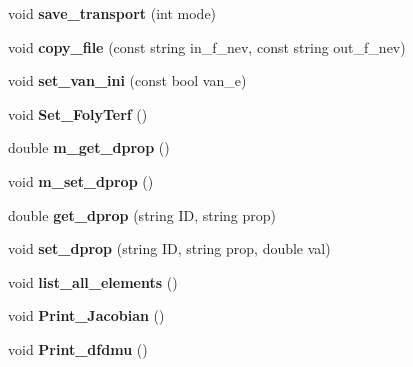 \begin{DoxyCompactItemize}
\item 
\mbox{\label{class_staci_a9c1d34d2dc05eaad3c5ba60d5ebfa5a1}} 
void {\bfseries save\+\_\+transport} (int mode)
\item 
\mbox{\label{class_staci_ac38df6cb7fb51eb595c17cd050a85073}} 
void {\bfseries copy\+\_\+file} (const string in\+\_\+f\+\_\+nev, const string out\+\_\+f\+\_\+nev)
\item 
\mbox{\label{class_staci_a0f2f821b672c0aa1a2f9a9117c2f67ef}} 
void {\bfseries set\+\_\+van\+\_\+ini} (const bool van\+\_\+e)
\item 
\mbox{\label{class_staci_ae13ac77f30c2f64ffbc44e9b271373ef}} 
void {\bfseries Set\+\_\+\+Foly\+Terf} ()
\item 
\mbox{\label{class_staci_a292d7cba265ab37d31bec35349fae1ac}} 
double {\bfseries m\+\_\+get\+\_\+dprop} ()
\item 
\mbox{\label{class_staci_a47fc932a04e285791a4cb4227e840004}} 
void {\bfseries m\+\_\+set\+\_\+dprop} ()
\item 
\mbox{\label{class_staci_af333518d7badd70d8ae324c0287a94e0}} 
double {\bfseries get\+\_\+dprop} (string ID, string prop)
\item 
\mbox{\label{class_staci_a1028b9dd75388d7d3e42d10b31a9e6eb}} 
void {\bfseries set\+\_\+dprop} (string ID, string prop, double val)
\item 
\mbox{\label{class_staci_a690304659f0bf2283a4e5dc20177661f}} 
void {\bfseries list\+\_\+all\+\_\+elements} ()
\item 
\mbox{\label{class_staci_a4f664e6fe326b5592664b2b7239612f2}} 
void {\bfseries Print\+\_\+\+Jacobian} ()
\item 
\mbox{\label{class_staci_abe8ddaf47c48ac2429acc5fe9c8010a5}} 
void {\bfseries Print\+\_\+dfdmu} ()
\item 
\mbox{\label{class_staci_ac3b009354096542602b5a6849f5114d2}} 

\end{DoxyCompactItemize}
